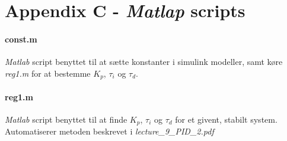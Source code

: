 \section*{Appendix C - \emph{Matlap} scripts}
\paragraph{ const.m }
	\emph{Matlab} script benyttet til at sætte konstanter i simulink modeller, samt
	køre \emph{reg1.m} for at bestemme $K_p$, $\tau_i$ og $\tau_d$.

	
\paragraph{ reg1.m }\label{app:reg1}
	\emph{Matlab} script benyttet til at finde $K_p$, $\tau_i$ og $\tau_d$ for et
	givent, stabilt system. Automatiserer metoden beskrevet i
	\emph{lecture\_9\_PID\_2.pdf}

